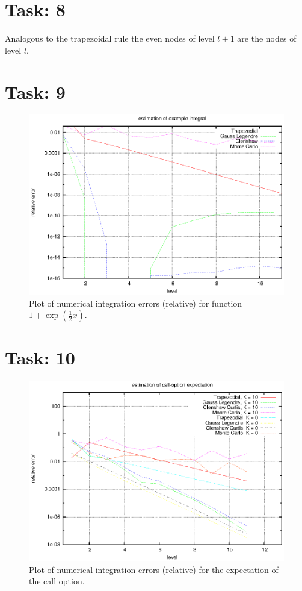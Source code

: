\documentclass{article}
\begin{document}
\section*{Task: 8}

Analogous to the trapezoidal rule the even nodes of level $l+1$ are the nodes of level $l$.

\newpage
\section*{Task: 9}

\begin{figure}[htbp]
  \centering
     \includegraphics[width=1.0\textwidth]{../Task09/task9_convergence_plot.eps}
   \caption{Plot of numerical integration errors (relative) for function $1+\exp\left(\frac{1}{2}x\right)$.}
\end{figure}

\newpage
\section*{Task: 10}

\begin{figure}[htbp]
  \centering
     \includegraphics[width=1.0\textwidth]{../Task10/task10_convergence_plot.eps}
   \caption{Plot of numerical integration errors (relative) for the expectation of the call option.}
\end{figure}
\end{document}
